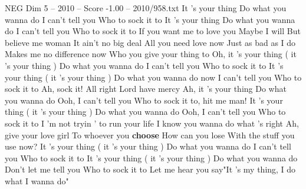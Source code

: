 \begin{textsample}{NEG Dim 5 – 2010 – Score -1.00 – 2010/958.txt}  \label{ex:f5_neg_004}
It 's your thing Do what you wanna do I can't tell you Who to sock it to It 's your thing Do what you wanna do I can't tell you Who to sock it to If you want me to love you Maybe I will But believe me woman It ain't no big deal All you need love now Just as bad as I do Makes me no difference now Who you give your thing to Oh, it 's your thing ( it 's your thing ) Do what you wanna do I can't tell you Who to sock it to It 's your thing ( it 's your thing ) Do what you wanna do now I can't tell you Who to sock it to Ah, sock it!
All right Lord have mercy Ah, it 's your thing Do what you wanna do Ooh, I can't tell you Who to sock it to, hit me man!
It 's your thing ( it 's your thing ) Do what you wanna do Ooh, I can't tell you Who to sock it to I 'm not tryin ' to run your life I know you wanna do what 's right Ah, give your love girl To whoever you \textbf{choose} How can you lose With the stuff you use now?
It 's your thing ( it 's your thing ) Do what you wanna do I can't tell you Who to sock it to It 's your thing ( it 's your thing ) Do what you wanna do Don't let me tell you Who to sock it to Let me hear you say"It 's my thing, I do what I wanna do"

\end{textsample}
